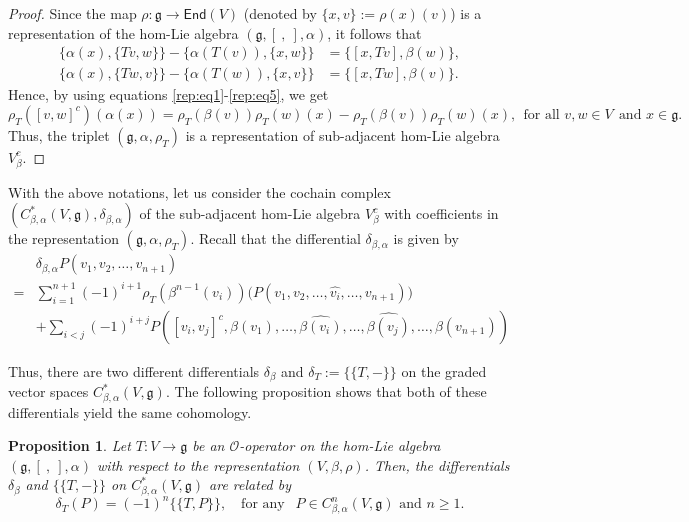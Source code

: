 \documentclass[a4paper,11pt]{amsart}
\theoremstyle{plain}
\newtheorem{proposition}[theorem]{Proposition}
\theoremstyle{definition}
\theoremstyle{remark}
\numberwithin{equation}{section}
\begin{document}
\begin{proof}
Since the map $\rho:\mathfrak{g}\rightarrow \mathsf{End}(V)$ (denoted by $\{x,v\}:=\rho(x)(v)$) is a representation of the hom-Lie algebra $(\mathfrak{g},[~,~],\alpha)$, it follows that 
\begin{align}
\{\alpha(x),\{Tv,w\}\}-\{\alpha(T(v)),\{x,w\}\}&=\{[x,Tv],\beta(w)\},\\\label{rep:eq5}
\{\alpha(x),\{Tw,v\}\}-\{\alpha(T(w)),\{x,v\}\}&=\{[x,Tw],\beta(v)\}.
\end{align}
Hence, by using equations \eqref{rep:eq1}-\eqref{rep:eq5}, we get
$$\rho_T([v,w]^c)(\alpha(x))= \rho_T(\beta(v))\rho_T(w)(x)-\rho_T(\beta(v))\rho_T(w)(x), ~~\mbox{for all } v,w \in V~~\mbox{and } x\in \mathfrak{g}.$$
Thus, the triplet $(\mathfrak{g},\alpha,\rho_T)$ is a representation of sub-adjacent hom-Lie algebra $V^c_{\beta}$.
\end{proof}

With the above notations, let us consider the cochain complex $(C^*_{\beta,\alpha}(V,\mathfrak{g}),\delta_{\beta,\alpha})$ of the sub-adjacent hom-Lie algebra $V^c_{\beta}$ with coefficients in the representation $(\mathfrak{g},\alpha,\rho_T)$. Recall that the differential $\delta_{\beta,\alpha}$ is given by 
\begin{align}\label{coboundary:subadjacent hom-Lie algebra}
&\delta_{\beta,\alpha} P(v_1,v_2,\ldots,v_{n+1})\\\nonumber
= &\sum_{i=1}^{n+1}(-1)^{i+1}\rho_T(\beta^{n-1}(v_i))\big( P(v_1,v_2,\ldots,\hat{v_i},\ldots,v_{n+1})\big)\\\nonumber
&+\sum_{ i<j }(-1)^{i+j}P([v_i,v_j]^c,\beta(v_1),\ldots,\hat{\beta(v_i)},\ldots,\hat{\beta(v_j)},\ldots,\beta(v_{n+1}))
\end{align}

Thus, there are two different differentials $\delta_\beta$ and $\delta_T:=\{\!\!\{T,- \}\!\!\}$ on the graded vector spaces $C^*_{\beta,\alpha}(V,\mathfrak{g})$. The following proposition shows that both of these differentials yield the same cohomology.

\begin{proposition}
Let $T:V\rightarrow \mathfrak{g}$ be an $\mathcal{O}$-operator on the hom-Lie algebra $(\mathfrak{g},[~,~],\alpha)$ with respect to the representation $(V,\beta, \rho)$. Then, the differentials $\delta_{\beta}$ and $\{\!\!\{T,- \}\!\!\}$ on $C^*_{\beta,\alpha}(V,\mathfrak{g})$ are related by 
$$\delta_T(P)=(-1)^n\{\!\!\{T,P \}\!\!\},\quad \mbox{for any } ~~P\in C^n_{\beta,\alpha}(V,\mathfrak{g})\mbox{ and } n\geq 1.$$
\end{proposition}
\end{document}
